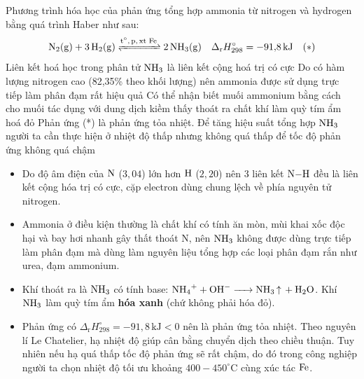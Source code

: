 \documentclass[11pt,a4paper]{article}
\begin{document}
\begin{ex}%
Phương trình hóa học của phản ứng tổng hợp ammonia từ nitrogen và hydrogen bằng quá trình Haber như sau:
$$\ce{N2(g) + 3H2(g) <=>[t^\circ, p, \text{xt Fe}] 2NH3(g)}\quad \Delta_\text{r}H^\circ_{298} = -91{,}8\,\text{kJ}\quad (*)$$
\choiceTF
{\True Liên kết hoá học trong phân tử $\ce{NH3}$ là liên kết cộng hoá trị có cực}
{Do có hàm lượng nitrogen cao (82,35\% theo khối lượng) nên ammonia được sử dụng trực tiếp làm phân đạm rất hiệu quả}
{Có thể nhận biết muối ammonium bằng cách cho muối tác dụng với dung dịch kiềm thấy thoát ra chất khí làm quỳ tím ẩm hoá đỏ}
{\True Phản ứng (*) là phản ứng tỏa nhiệt. Để tăng hiệu suất tổng hợp $\ce{NH3}$ người ta cần thực hiện ở nhiệt độ thấp nhưng không quá thấp để tốc độ phản ứng không quá chậm}
\begin{loigiai}
\begin{itemize}[leftmargin=1.5cm]
\item[\textbf{a) ĐÚNG:}] Do độ âm điện của $\ce{N}$ ($3{,}04$) lớn hơn $\ce{H}$ ($2{,}20$) nên 3 liên kết $\ce{N-H}$ đều là liên kết cộng hóa trị có cực, cặp electron dùng chung lệch về phía nguyên tử nitrogen.
\item[\textbf{b) SAI:}] Ammonia ở điều kiện thường là chất khí có tính ăn mòn, mùi khai xốc độc hại và bay hơi nhanh gây thất thoát N, nên $\ce{NH3}$ không được dùng trực tiếp làm phân đạm mà dùng làm nguyên liệu tổng hợp các loại phân đạm rắn như urea, đạm ammonium.
\item[\textbf{c) SAI:}] Khí thoát ra là $\ce{NH3}$ có tính base: $\ce{NH4+ + OH- -> NH3 ^ + H2O}$. Khí $\ce{NH3}$ làm quỳ tím ẩm \textbf{hóa xanh} (chứ không phải hóa đỏ).
\item[\textbf{d) ĐÚNG:}] Phản ứng có $\Delta_\text{r}H^\circ_{298} = -91{,}8\,\text{kJ} < 0$ nên là phản ứng tỏa nhiệt. Theo nguyên lí Le Chatelier, hạ nhiệt độ giúp cân bằng chuyển dịch theo chiều thuận. Tuy nhiên nếu hạ quá thấp tốc độ phản ứng sẽ rất chậm, do đó trong công nghiệp người ta chọn nhiệt độ tối ưu khoảng $400 - 450^\circ\text{C}$ cùng xúc tác $\ce{Fe}$.
\end{itemize}
\end{loigiai}
\end{ex}
\end{document}
